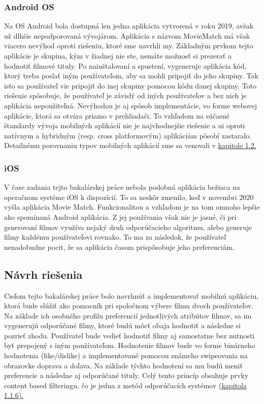 \subsubsection{Android OS}
Na OS Android bola dostupná len jedna aplikácia vytvorená v roku 2019, avšak už dlhšie nepodporovaná vývojárom. Aplikácia s názvom MovieMatch má však viacero nevýhod oproti riešeniu, ktoré sme navrhli my. Základným prvkom tejto aplikácie je skupina, kým v žiadnej nie ste, nemáte možnosť si prezerať a hodnotiť filmové tituly. Po nainštalovaní a spustení, vygeneruje aplikácia kód, ktorý treba poslať iným používateľom, aby sa mohli pripojiť do jeho skupiny. Tak isto sa používateľ vie pripojiť do inej skupiny pomocou kódu danej skupiny. Toto riešenie spôsobuje, že používateľ je závislý od iných používateľov a bez nich je aplikácia nepoužiteľná. Nevýhodou je aj spôsob implementácie, vo forme webovej aplikácie, ktorá sa otvára priamo v prehliadači. To vzhľadom na súčasné štandardy vývoja mobilných aplikácií nie je najvhodnejšie riešenie a \acrshort{ui} oproti natívnym a hybridným (resp. cross platformovým) aplikáciám pôsobí zastaralo. Detailnému porovnaniu typov mobilných aplikácií sme sa venovali v \hyperref[sec:typy aplikacii]{kapitole 1.2.}
\subsubsection{iOS}
V čase zadania tejto bakalárskej práce nebola podobná aplikácia bežiaca na operačnom systéme iOS k dispozícií. To sa neskôr zmenilo, keď v novembri 2020 vyšla aplikácia Movie Match. Funkcionalitou a vzhľadom je na tom omnoho lepšie ako spomínaná Android aplikácia. Z jej používania však nie je jasné, či pri generovaní filmov využíva nejaký druh odporúčacieho algoritmu, alebo generuje filmy každému používateľovi rovnako. To ma za následok, že  používateľ nenadobudne pocit, že sa aplikácia časom prispôsobuje jeho preferenciám. 


\subsection{Návrh riešenia}
Cieľom tejto bakalárskej práce bolo navrhnúť a implementovať mobilnú aplikáciu, ktorá bude slúžiť ako pomocník pri spoločnom výbere filmu dvoch používateľov. Na základe ich osobného profilu preferencií jednotlivých atribútov filmov, sa im vygenerujú odporúčané filmy, ktoré budú môcť obaja hodnotiť a následne si pozrieť zhodu. Používateľ bude vedieť hodnotiť filmy aj samostatne bez nutnosti byť prepojený s iným používateľom. Hodnotenie filmov bude vo forme binárneho hodnotenia (like/dislike) a implementované pomocou známeho swipeovania na obrazovke doprava a doľava. Na základe týchto hodnotení sa mu budú meniť preferencie a následne aj odporúčané tituly. Celý tento princíp obsahuje prvky content based filteringu, čo je jedna z metód odporúčacích systémov \hyperref[sec:contentbased]{(kapitola 1.1.6).}

